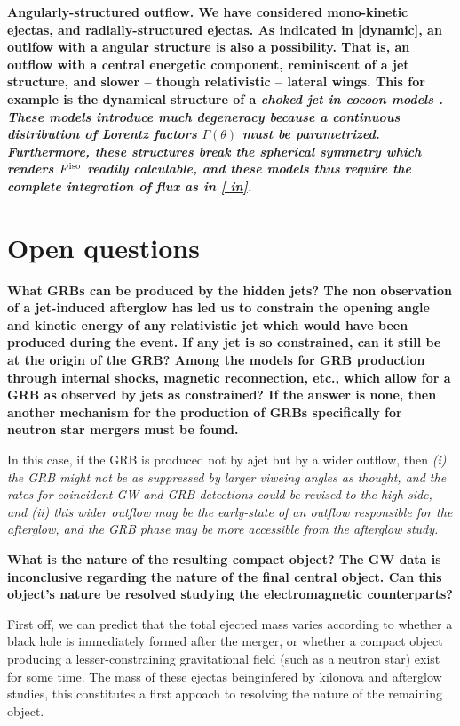 \bf{Angularly-structured outflow.} We have considered mono-kinetic ejectas, and radially-structured ejectas. As indicated in \ref{dynamic}, an outlfow with a angular structure is also a possibility. That is, an outflow with a central energetic component, reminiscent of a jet structure, and slower -- though relativistic -- lateral wings. This for example is the dynamical structure of a \it{choked jet} in cocoon models \cite{42, 5}. These models introduce much degeneracy because a continuous distribution of Lorentz factors $\Gamma(\theta)$ must be parametrized. Furthermore, these structures break the spherical symmetry which renders $F^{\rm{iso}}$ readily calculable, and these models thus require the complete integration of flux as in \ref{ in}.

\section{Open questions}

\bf{What GRBs can be produced by the hidden jets? }The non observation of a jet-induced afterglow has led us to constrain the opening angle and kinetic energy of any relativistic jet which would have been produced during the event. If any jet is so constrained, can it still be at the origin of the GRB? Among the models for GRB production through internal shocks, magnetic reconnection, etc., which allow for a GRB as observed by jets as constrained? If the answer is none, then another mechanism for the production of GRBs specifically for neutron star mergers must be found.

In this case, if the GRB is produced not by ajet but by a wider outflow, then \it{(i)} the GRB might not be as suppressed by larger viweing angles as thought, and the rates for coincident GW and GRB detections could be revised to the high side, and \it{(ii)} this wider outflow may be the early-state of an outflow responsible for the afterglow, and the GRB phase may be more accessible from the afterglow study.

\bf{What is the nature of the resulting compact object? }The GW data is inconclusive regarding the nature of the final central object. Can this object's nature be resolved studying the electromagnetic counterparts?

First off, we can predict that the total ejected mass varies according to whether a black hole is immediately formed after the merger, or whether a compact object producing a lesser-constraining gravitational field (such as a neutron star) exist for some time. The mass of these ejectas beinginfered by kilonova and afterglow studies, this constitutes a first appoach to resolving the nature of the remaining object.

